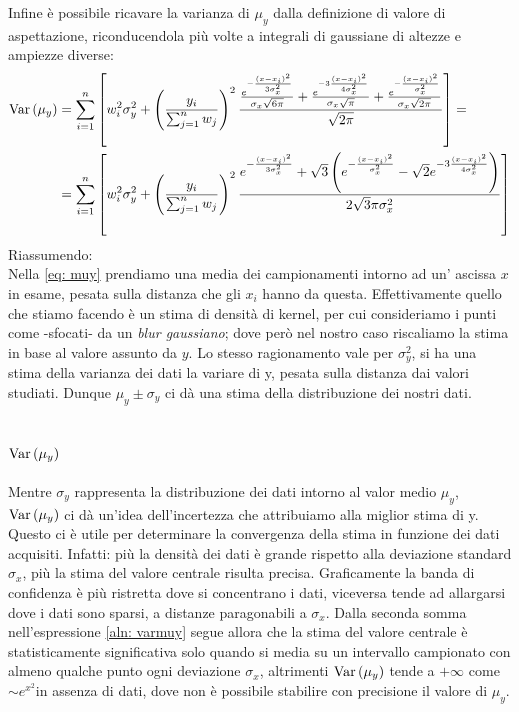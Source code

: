 \documentclass{article}[a4paper, oneside, 11pt]
\begin{document}
Infine è possibile ricavare la varianza di $\mu_y$ dalla definizione di valore
di aspettazione, riconducendola più volte a integrali di gaussiane di altezze
e ampiezze diverse:
\begin{align}
	\text{Var}\left(\mu_y\right) &= \sum_{i=1}^{n} \left[w_i^2 \sigma_y^2 + 
	\left(\frac{y_i}{\sum_{j=1}^{n} w_j}  \right)^2 \frac{
	\frac{e^{-\frac{(x-x_i)^2}{3 \sigma_x^2}}} {\sigma_x \sqrt{6 \pi} } +
	\frac{e^{-3\frac{(x-x_i)^2}{4 \sigma_x^2}}} {\sigma_x \sqrt{\pi} } +
	\frac{e^{-\frac{(x-x_i)^2}{\sigma_x^2}}} {\sigma_x \sqrt{2 \pi}}
	} {\sqrt{2 \pi}} \right] =\\ \label{aln: varmuy}
        &= \sum_{i=1}^{n} \left[w_i^2 \sigma_y^2 + 
	\left(\frac{y_i}{\sum_{j=1}^{n} w_j}  \right)^2 \frac{
	e^{-\frac{(x-x_i)^2}{3 \sigma_x^2}} +  
	\sqrt{3}\left( e^{-\frac{(x-x_i)^2}{\sigma_x^2}} -
	\sqrt{2} e^{-3 \frac{(x-x_i)^2}{4 \sigma_x^2}} \right)
	} {2 \sqrt{3}\pi \sigma_x^2} \right]
\end{align}
Riassumendo:\\
Nella \eqref{eq: muy} prendiamo una media dei campionamenti intorno ad un'
ascissa $x$ in esame, pesata sulla distanza che gli $x_i$ hanno da questa. 
Effettivamente quello che stiamo facendo è un stima di densità di kernel,
per cui consideriamo i punti come -sfocati- da un \emph{blur gaussiano};
dove però nel nostro caso riscaliamo la stima in base al valore assunto da $y$.
Lo stesso ragionamento vale per $\sigma_y^2$, si ha una stima della varianza
dei dati la variare di y, pesata sulla distanza dai valori studiati. Dunque
$\mu_y \pm \sigma_y$ ci dà una stima della distribuzione dei nostri dati.
\subsection{$\text{Var}\left(\mu_y\right)$}
Mentre $\sigma_y$ rappresenta la distribuzione dei dati intorno al valor medio 
$\mu_y$, $\text{Var}\left(\mu_y\right)$ ci dà un'idea dell’incertezza che attribuiamo alla
miglior stima di y. Questo ci è utile per determinare la convergenza della
stima in funzione dei dati acquisiti.
Infatti: più la densità dei dati è grande rispetto alla deviazione standard
$\sigma_x$, più la stima del valore centrale risulta precisa. Graficamente
la banda di confidenza è più ristretta dove si concentrano i dati, viceversa
tende ad allargarsi dove i dati sono sparsi, a distanze paragonabili a
$\sigma_x$. Dalla seconda somma nell'espressione \eqref{aln: varmuy} segue
allora che la stima del valore centrale è statisticamente significativa solo
quando si media su un intervallo campionato con almeno qualche punto ogni
deviazione $\sigma_x$, altrimenti $\text{Var}\left(\mu_y\right)$ tende a $+\infty$ come 
$\sim e^{x^2}$in assenza di dati, dove non è possibile stabilire con
precisione il valore di $\mu_y$.
\end{document}
